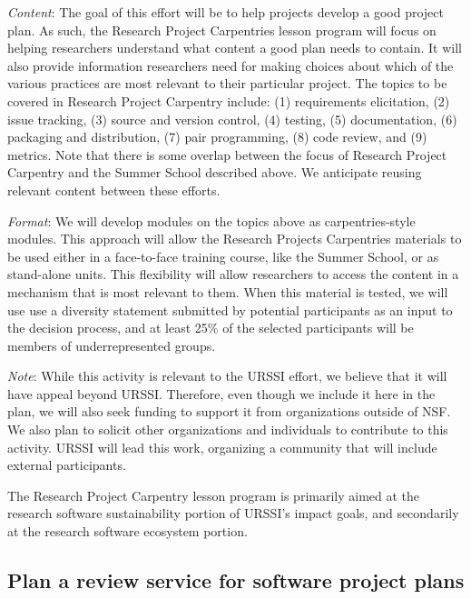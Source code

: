 \documentclass[
]{book}
\begin{document}
\emph{Content}: The goal of this effort will be to help projects develop a good project plan.
As such, the Research Project Carpentries lesson program will focus on helping researchers
understand what content a good plan needs to contain. It will also provide information
researchers need for making choices about which of the various practices are most relevant
to their particular project. The topics to be covered in Research Project Carpentry include:
(1) requirements elicitation, (2) issue tracking, (3) source and version control, (4) testing,
(5) documentation, (6) packaging and distribution, (7) pair programming, (8) code review, and
(9) metrics. Note that there is some overlap between the focus of Research Project Carpentry
and the Summer School described above. We anticipate reusing relevant content between these efforts.

\emph{Format}: We will develop modules on the topics above as carpentries-style modules. This approach
will allow the Research Projects Carpentries materials to be used either in a face-to-face training
course, like the Summer School, or as stand-alone units. This flexibility will allow researchers
to access the content in a mechanism that is most relevant to them. When this material is tested,
we will use use a diversity statement submitted by potential participants as an input to the decision
process, and at least 25\% of the selected participants will be members of underrepresented groups.

\emph{Note}: While this activity is relevant to the URSSI effort, we believe that it will have appeal
beyond URSSI. Therefore, even though we include it here in the plan, we will also seek funding to
support it from organizations outside of NSF. We also plan to solicit other organizations and
individuals to contribute to this activity. URSSI will lead this work, organizing a community
that will include external participants.

The Research Project Carpentry lesson program is primarily aimed at the research software sustainability portion of URSSI's impact goals, and secondarily at the research software ecosystem portion.

\hypertarget{plan-a-review-service-for-software-project-plans}{%
\subsection{Plan a review service for software project plans}\label{plan-a-review-service-for-software-project-plans}}
\end{document}
